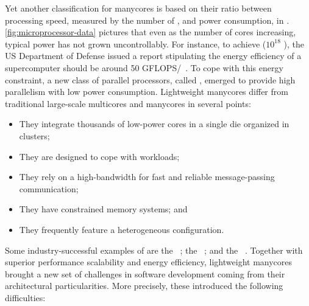 	Yet another classification for manycores is based on
	their ratio between processing speed, measured by the number of \flops, and power consumption,
	in \watts. \autoref{fig:microprocessor-data} pictures that even as the
	number of cores increasing, typical power has not grown uncontrollably.
	For instance, to achieve \exascale ($10^{18}$ \flops), the US Department
	of Defense issued a report stipulating the energy efficiency of a
	supercomputer should be around 50 GFLOPS/\watts~\cite{darpa:exascale}. 
	To cope with this energy constraint, a new class of
	parallel processors, called \textit{\lightweight \manycores}, emerged to
	provide high parallelism with low power consumption.
	Lightweight manycores differ from traditional large-scale
	multicores and manycores in several points: 

	\begin{itemize}
		\item They integrate thousands of low-power cores in a single die organized in clusters;
		\item They are designed to cope with \mimd workloads;
		\item They rely on a high-bandwidth \noc for fast and reliable message-passing communication;
		\item They have constrained memory systems; and
		\item They frequently feature a heterogeneous configuration.
	\end{itemize}

	Some industry-successful examples of \lightweight \manycores are the
	\mppa~\cite{DeDinechin2013-1}; the \epiphany~\cite{olofsson2014};
	and the \taihulight~\cite{zheng2015}. Together with superior performance
	scalability and energy efficiency, lightweight manycores brought a new
	set of challenges in software development coming from their
	architectural particularities. More precisely, these 
	introduced the following difficulties:

